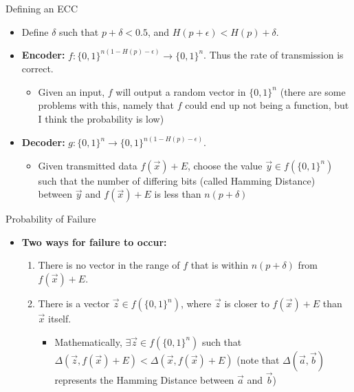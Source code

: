 \documentclass[aspectratio=169]{beamer}
\begin{document}
    \begin{frame}{Defining an ECC}
          \begin{itemize}
                \item Define $\delta$ such that $p + \delta < 0.5$, and $H(p + \epsilon)< H(p) + \delta$.
                \item \textbf{Encoder:} $f: \{0, 1\}^{n(1-H(p)-\epsilon)} \to \{0, 1\}^{n}$. Thus the rate of transmission is correct.
                  \begin{itemize}
                \item Given an input, $f$ will output a random vector in $\{0, 1\}^{n}$ (there are some problems with this, namely that $f$ could end up not being a function, but I think the probability is low)
                          \end{itemize}
                \item \textbf{Decoder:} $g: \{0, 1\}^{n} \to \{0, 1\}^{n(1-H(p)-\epsilon)}$.
                  \begin{itemize}
                      \item Given transmitted data $f(\vec{x}) + E$, choose the value $\vec{y} \in f(\{0, 1\}^{n})$ such that the number of differing bits (called Hamming Distance) between $\vec{y}$ and $f(\vec{x}) + E$ is less than $n(p + \delta)$
                          \end{itemize}
              \end{itemize}
      \end{frame}

    \begin{frame}{Probability of Failure}
        \begin{itemize}
                \item \textbf{Two ways for failure to occur:}
                \begin{enumerate}
                        \item There is no vector in the range of $f$ that is within $n(p + \delta)$ from $f(\vec{x}) + E$.
                        \item There is a vector $\vec{z} \in f(\{0, 1\}^{n})$, where $\vec{z}$ is closer to $f(\vec{x}) + E$ than $\vec{x}$ itself.
                        \begin{itemize}
                                \item Mathematically, $\exists \vec{z} \in f(\{0, 1\}^{n})$ such that $\Delta(\vec{z}, f(\vec{x}) + E) < \Delta(\vec{x}, f(\vec{x}) + E)$ (note that $\Delta(\vec{a}, \vec{b})$ represents the Hamming Distance between $\vec{a}$ and $\vec{b}$)
                                \end{itemize}
                        \end{enumerate}
          \end{itemize}
      \end{frame}
\end{document}
